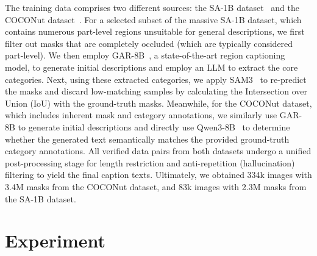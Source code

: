 \documentclass{llmxive}
\begin{document}
The training data comprises two different sources: the SA-1B dataset~\citep{kirillov2023segment} and the COCONut dataset~\citep{deng2024coconut}. For a selected subset of the massive SA-1B dataset, which contains numerous part-level regions unsuitable for general descriptions, we first filter out masks that are completely occluded (which are typically considered part-level). 
%
We then employ GAR-8B~\citep{wang2025grasp}, a state-of-the-art region captioning model, to generate initial descriptions and employ an LLM to extract the core categories. 
%
Next, using these extracted categories, we apply SAM3~\citep{carion2025sam} to re-predict the masks and discard low-matching samples by calculating the Intersection over Union (IoU) with the ground-truth masks. 
%
Meanwhile, for the COCONut dataset, which includes inherent mask and category annotations, we similarly use GAR-8B to generate initial descriptions and directly use Qwen3-8B~\citep{yang2025qwen3} to determine whether the generated text semantically matches the provided ground-truth category annotations.
%
All verified data pairs from both datasets undergo a unified post-processing stage for length restriction and anti-repetition (hallucination) filtering to yield the final caption texts. Ultimately, we obtained 334k images with 3.4M masks from the COCONut dataset, and 83k images with 2.3M masks from the SA-1B dataset. 
\vspace{-3mm}
\section{Experiment}
\label{sec:exp}

\end{document}
